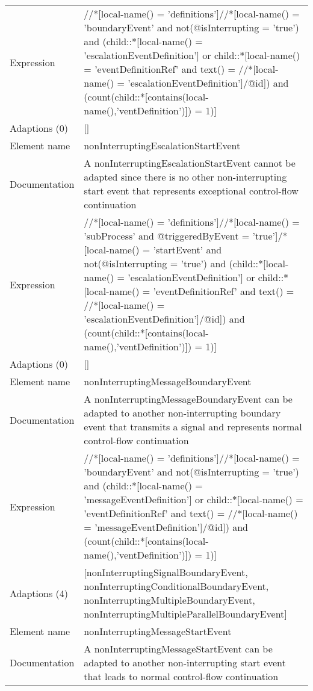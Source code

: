 \begin{center}
\begin{tiny}
\begin{longtable}{p{}|p{}}
Expression & //*[local-name() = 'definitions']//*[local-name() = 'boundaryEvent' and not(@isInterrupting = 'true') and (child::*[local-name() = 'escalationEventDefinition'] or child::*[local-name() = 'eventDefinitionRef' and text() = //*[local-name() = 'escalationEventDefinition']/@id]) and (count(child::*[contains(local-name(),'ventDefinition')]) = 1)]\\
\myrowcolour
Adaptions (0) & []\\
\midrule
Element name & nonInterruptingEscalationStartEvent\\
\myrowcolour
Documentation &A nonInterruptingEscalationStartEvent cannot be adapted since there is no other non-interrupting start event that represents exceptional control-flow continuation\\
Expression & //*[local-name() = 'definitions']//*[local-name() = 'subProcess' and @triggeredByEvent = 'true']/*[local-name() = 'startEvent' and not(@isInterrupting = 'true') and (child::*[local-name() = 'escalationEventDefinition'] or child::*[local-name() = 'eventDefinitionRef' and text() = //*[local-name() = 'escalationEventDefinition']/@id]) and (count(child::*[contains(local-name(),'ventDefinition')]) = 1)]\\
\myrowcolour
Adaptions (0) & []\\
\midrule
Element name & nonInterruptingMessageBoundaryEvent\\
\myrowcolour
Documentation &A nonInterruptingMessageBoundaryEvent can be adapted to another non-interrupting boundary event that transmits a signal and represents normal control-flow continuation\\
Expression & //*[local-name() = 'definitions']//*[local-name() = 'boundaryEvent' and not(@isInterrupting = 'true') and (child::*[local-name() = 'messageEventDefinition'] or child::*[local-name() = 'eventDefinitionRef' and text() = //*[local-name() = 'messageEventDefinition']/@id]) and (count(child::*[contains(local-name(),'ventDefinition')]) = 1)]\\
\myrowcolour
Adaptions (4) & [nonInterruptingSignalBoundaryEvent, nonInterruptingConditionalBoundaryEvent, nonInterruptingMultipleBoundaryEvent, nonInterruptingMultipleParallelBoundaryEvent]\\
\midrule
Element name & nonInterruptingMessageStartEvent\\
\myrowcolour
Documentation &A nonInterruptingMessageStartEvent can be adapted to another non-interrupting start event that leads to normal control-flow continuation\\

\end{longtable}
\end{tiny}
\end{center}
